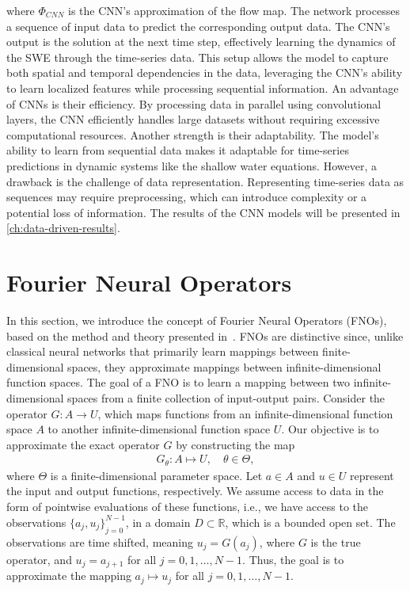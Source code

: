 where $\Phi_{CNN}$ is the CNN's approximation of the flow map.
The network processes a sequence of input data to predict the corresponding output data.
The CNN's output is the solution at the next time step, effectively learning the dynamics of the SWE through the time-series data.
This setup allows the model to capture both spatial and temporal dependencies in the data, leveraging the CNN's ability to learn localized features while processing sequential information.
An advantage of CNNs is their efficiency.
By processing data in parallel using convolutional layers, the CNN efficiently handles large datasets without requiring excessive computational resources.
Another strength is their adaptability. The model's ability to learn from sequential data makes it adaptable for time-series predictions in dynamic systems like the shallow water equations.
However, a drawback is the challenge of data representation.
Representing time-series data as sequences may require preprocessing, which can introduce complexity or a potential loss of information.
The results of the CNN models will be presented in \autoref{ch:data-driven-results}.

\section{Fourier Neural Operators}
In this section, we introduce the concept of Fourier Neural Operators (FNOs), based on the method and theory presented in~\cite{FNO_2021}.
FNOs are distinctive since, unlike classical neural networks that primarily learn mappings between finite-dimensional spaces, they approximate mappings between infinite-dimensional function spaces.
The goal of a FNO is to learn a mapping between two infinite-dimensional spaces from a finite collection of input-output pairs.
Consider the operator $G: A \to U$, which maps functions from an infinite-dimensional function space $A$ to another infinite-dimensional function space $U$.
Our objective is to approximate the exact operator $G$ by constructing the map
\begin{align}\label{eq:FNO_map}
    G_{\theta}: A \mapsto U, \quad \theta \in \Theta,
\end{align} 
where $\Theta$ is a finite-dimensional parameter space.
Let $a \in A$ and $u \in U$ represent the input and output functions, respectively.
We assume access to data in the form of pointwise evaluations of these functions, i.e., we have access to the observations ${\{a_j, u_j \}}_{j=0}^{N-1}$, in a domain $D \subset \mathbb{R}$, which is a bounded open set.
The observations are time shifted, meaning $u_j = G(a_j)$, where $G$ is the true operator, and $u_j = a_{j+1}$ for all $j = 0, 1, \ldots, N-1$.
Thus, the goal is to approximate the mapping $a_j \mapsto u_j$ for all $j = 0, 1, \ldots, N-1$.

